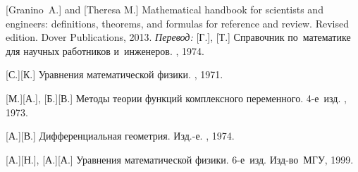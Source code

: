 \begin{thebibliography}{123}
\begin{otherlanguage}{russian}
[Granino~A.] and [Theresa M.]
Mathematical handbook for scientists and engineers: definitions, theorems, and formulas for reference and review.
Revised edition. Dover Publications, 2013. 
\emph{Перевод:} [Г.], [Т.] Справочник по~математике для научных работников и~инженеров. \naukapublisher, 1974. 

[С.][К.] Уравнения математической физики. \naukapublisher, 1971. 

[М.][А.], [Б.][В.] Методы теории функций комплексного переменного. 4\hbox{-}е~изд. \naukapublisher, 1973. 

[А.][В.] Дифференциальная геометрия. Изд.\hbox{-}е. \naukapublisher, 1974. 

[А.][Н.], [А.][А.] Уравнения математической физики. 6\hbox{-}е~изд. Изд\hbox{-}во~МГУ, 1999. 

\end{otherlanguage}

\normalsize
\end{thebibliography}
